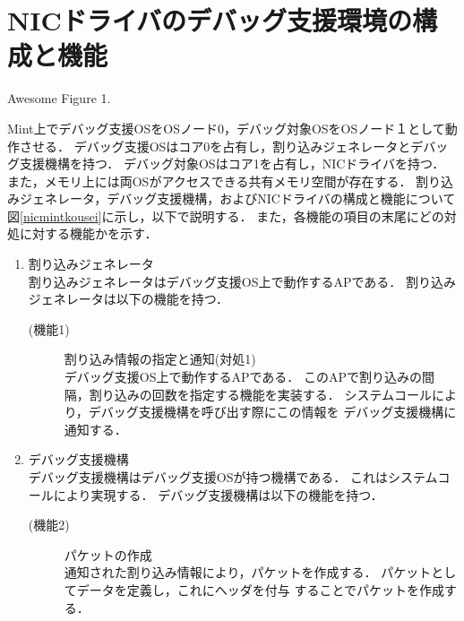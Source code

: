 \documentclass[tanilab-enum]{graduate}
\begin{document}
\section{NICドライバのデバッグ支援環境の構成と機能}
{Awesome Figure 1.}

Mint上でデバッグ支援OSをOSノード0，デバッグ対象OSをOSノード１として動作させる．
デバッグ支援OSはコア0を占有し，割り込みジェネレータとデバッグ支援機構を持つ．
デバッグ対象OSはコア1を占有し，NICドライバを持つ．
また，メモリ上には両OSがアクセスできる共有メモリ空間が存在する．
割り込みジェネレータ，デバッグ支援機構，およびNICドライバの構成と機能について
図\ref{nicmintkousei}に示し，以下で説明する．
また，各機能の項目の末尾にどの対処に対する機能かを示す．
\begin{enumerate}
    \item 割り込みジェネレータ\\
        割り込みジェネレータはデバッグ支援OS上で動作するAPである．
        割り込みジェネレータは以下の機能を持つ．
        \begin{description}
            \item[(機能1)] 割り込み情報の指定と通知(対処1)\\
                デバッグ支援OS上で動作するAPである．
                このAPで割り込みの間隔，割り込みの回数を指定する機能を実装する．
                システムコールにより，デバッグ支援機構を呼び出す際にこの情報を
                デバッグ支援機構に通知する．
        \end{description}
    \item デバッグ支援機構\\
        デバッグ支援機構はデバッグ支援OSが持つ機構である．
        これはシステムコールにより実現する．
        デバッグ支援機構は以下の機能を持つ．
        \begin{description}
            \item[(機能2)] パケットの作成\\
                通知された割り込み情報により，パケットを作成する．
                パケットとしてデータを定義し，これにヘッダを付与
                することでパケットを作成する．


\end{description}
\end{enumerate}
\end{document}
